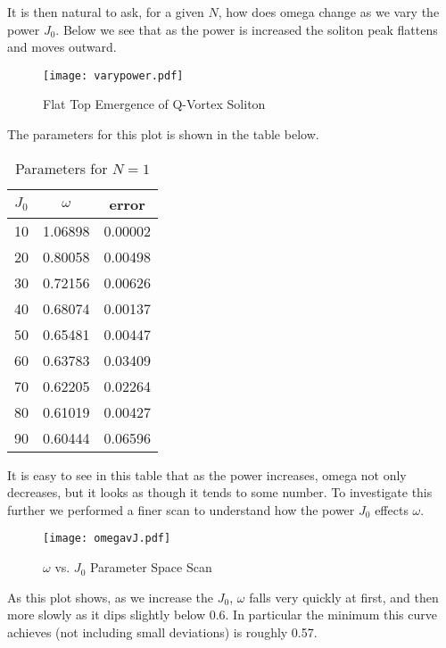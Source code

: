 It is then natural to ask, for a given $N$, how does omega change as we vary the power $J_0$. Below we see that as the power is increased the soliton peak flattens and moves outward.
\begin{figure}[H]
\centering
  \texttt{[image: varypower.pdf]}
  \caption{Flat Top Emergence of Q-Vortex Soliton}
  \label{fig:flattops}
\end{figure}
The parameters for this plot is shown in the table below.
\begin{table}[H]
    \centering
    \begin{tabular}{| c | c | c |} \hline
    $J_0$ & $\omega$ & error \\ \hline
    10 & 1.06898 & 0.00002 \\ \hline
    20 & 0.80058 & 0.00498 \\ \hline
    30 & 0.72156 & 0.00626 \\ \hline
    40 & 0.68074 & 0.00137 \\ \hline
    50 & 0.65481 & 0.00447 \\ \hline
    60 & 0.63783 & 0.03409 \\ \hline
    70 & 0.62205 & 0.02264 \\ \hline
    80 & 0.61019 & 0.00427 \\ \hline
    90 & 0.60444 & 0.06596 \\ \hline
    \end{tabular}
    \caption{Parameters for $N = 1$}
    \label{tab:paramsN}
\end{table}
It is easy to see in this table that as the power increases, omega not  only decreases, but it looks as though it tends to some number. To investigate this further we performed a finer scan to understand how the power $J_0$ effects $\omega$.
\begin{figure}[H]
\centering
  \texttt{[image: omegavJ.pdf]}
  \caption{$\omega$ vs. $J_0$ Parameter Space Scan}
  \label{fig:paramspace}
\end{figure}
As this plot shows, as we increase the $J_0$, $\omega$ falls very quickly at first, and then more slowly as it dips slightly below 0.6. In particular the minimum this curve achieves (not including small deviations) is roughly 0.57.






